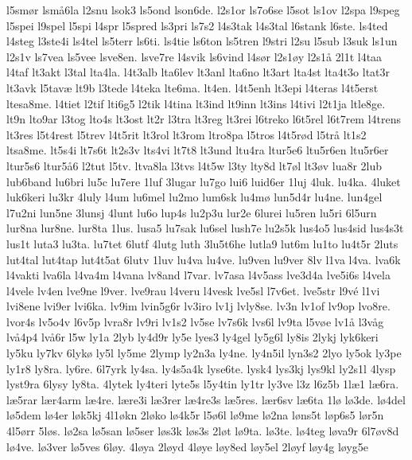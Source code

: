 {l5sm^^f8r
lsm^^e56la
l2snu
lsok3
ls5ond
lson6de.
l2s1or
ls7o6se
l5sot
ls1ov
l2spa
l9speg
l5spei
l9spel
l5spi
l4spr
l5spred
ls3pri
ls7s2
l4s3tak
l4s3tal
l6stank
l6ste.
ls4ted
l4steg
l3ste4i
ls4tel
ls5terr
ls6ti.
ls4tie
ls6ton
ls5tren
l9stri
l2su
l5sub
l3suk
ls1un
l2s1v
ls7vea
ls5vee
lsve8en.
lsve7re
l4svik
ls6vind
l4s^^f8r
l2s1^^f8y
l2s1^^e5
2l1t
l4taa
l4taf
lt3akt
l3tal
lta4la.
l4t3alb
lta6lev
lt3anl
lta6no
lt3art
lta4st
lta4t3o
ltat3r
lt3avk
l5tav^^e6
lt9b
l3tede
l4teka
lte6ma.
lt4en.
l4t5enh
lt3epi
l4teras
l4t5erst
ltesa8me.
l4tiet
l2tif
lti6g5
l2tik
l4tina
lt3ind
lt9inn
lt3ins
l4tivi
l2t1ja
ltle8ge.
lt9n
lto9ar
l3tog
lto4s
lt3ost
lt2r
l3tra
lt3reg
lt3rei
l6treko
l6t5rel
l6t7rem
l4trens
lt3res
l5t4rest
l5trev
l4t5rit
lt3rol
lt3rom
ltro8pa
l5tros
l4t5r^^f8d
l5tr^^e5
lt1s2
ltsa8me.
lt5s4i
lt7s6t
lt2s3v
lts4vi
lt7t8
lt3und
ltu4ra
ltur5e6
ltu5r6en
ltu5r6er
ltur5s6
ltur5^^e56
l2tut
l5tv.
ltva8la
l3tvs
l4t5w
l3ty
lty8d
lt7^^f8l
lt3^^f8v
lua8r
2lub
lub6band
lu6bri
lu5c
lu7ere
1luf
3lugar
lu7go
lui6
luid6er
1luj
4luk.
lu4ka.
4luket
luk6keri
lu3kr
4luly
l4um
lu6mel
lu2mo
lum6sk
lu4m^^f8
lun5d4r
lu4ne.
lun4gel
l7u2ni
lun5ne
3lunsj
4lunt
lu6o
lup4s
lu2p3u
lur2e
6lurei
lu5ren
lu5ri
6l5urn
lur8na
lur8ne.
lur8ta
1lus.
lusa5
lu7sak
lu6sel
lush7e
lu2s5k
lus4o5
lus4sid
lus4s3t
lus1t
luta3
lu3ta.
lu7tet
6lutf
4lutg
luth
3lu5t6he
lutla9
lut6m
lu1to
lu4t5r
2luts
lut4tal
lut4tap
lut4t5at
6lutv
1luv
lu4va
lu4ve.
lu9ven
lu9ver
8lv
l1va
l4va.
lva6k
l4vakti
lva6la
l4va4m
l4vana
lv8and
l7var.
lv7asa
l4v5ass
lve3d4a
lve5i6s
l4vela
l4vele
lv4en
lve9ne
l9ver.
lve9rau
l4veru
l4vesk
lve5sl
l7v6et.
lve5str
l9v^^e9
l1vi
lvi8ene
lvi9er
lvi6ka.
lv9im
lvin5g6r
lv3iro
lv1j
lvly8se.
lv3n
lv1of
lv9op
lvo8re.
lvor4s
lv5o4v
l6v5p
lvra8r
lv9ri
lv1s2
lv5se
lv7s6k
lvs6l
lv9ta
l5v^^f8e
lv1^^e5
l3v^^e5g
lv^^e54p4
lv^^e56r
l5w
ly1a
2lyb
ly4d9r
ly5e
lyes3
ly4gel
ly5g6l
ly8is
2lykj
lyk6keri
ly5ku
ly7kv
6lyk^^f8
ly5l
ly5me
2lymp
ly2n3a
ly4ne.
ly4n5il
lyn3s2
2lyo
ly5ok
ly3pe
ly1r8
ly8ra.
ly6re.
6l7yrk
ly4sa.
ly4s5a4k
lyse6te.
lysk4
lys3kj
lys9kl
ly2s1l
4lysp
lyst9ra
6lysy
ly8ta.
4lytek
ly4teri
lyte5s
l5y4tin
ly1tr
ly3ve
l3z
l6z5b
1l^^e61
l^^e66ra.
l^^e65rar
l^^e6r4arm
l^^e64re.
l^^e6re3i
l^^e63rer
l^^e64re3s
l^^e65res.
l^^e6r6sv
l^^e66ta
1l^^f8
l^^f83de.
l^^f84del
l^^f85dem
l^^f84er
l^^f8k5kj
4l1^^f8kn
2l^^f8ko
l^^f84k5r
l5^^f86l
l^^f89me
l^^f82na
l^^f8ns5t
l^^f8p6s5
l^^f8r5n
4l5^^f8rr
5l^^f8s.
l^^f82sa
l^^f85san
l^^f85ser
l^^f8s3k
l^^f8s3s
2l^^f8t
l^^f89ta.
l^^f83te.
l^^f84teg
l^^f8va9r
6l7^^f8v8d
l^^f84ve.
l^^f83ver
l^^f85ves
6l^^f8y.
4l^^f8ya
2l^^f8yd
4l^^f8ye
l^^f8y8ed
l^^f8y5el
2l^^f8yf
l^^f8y4g
l^^f8yg5e
}
